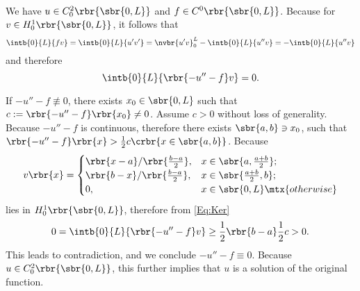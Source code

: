 \documentclass[english, nochinese]{pkupaper}
\title{\titlemark}
\author{\authoring}
\begin{document}
\maketitle

\begin{thmquestion}
\ 
\begin{thmproof}
We have $ u \in C_0^2 \rbr{\sbr{ 0, L }} $ and $ f \in C^0 \rbr{\sbr{ 0, L }} $. Because for $ v \in H_0^1 \rbr{\sbr{ 0, L }} $, it follows that
\begin{equation}
\intb{0}{L}{ f v } = \intb{0}{L}{ u' v' } = \nvbr{ u' v }_0^L - \intb{0}{L}{ u'' v } = -\intb{0}{L}{ u'' v }
\end{equation}
and therefore
\begin{equation} \label{Eq:Ker}
\intb{0}{L}{ \rbr{ -u'' - f } v } = 0.
\end{equation}

If $ -u'' - f \nequiv 0 $, there exists $ x_0 \in \sbr{ 0, L } $ such that $ c := \rbr{ -u'' - f } \rbr{x_0} \neq 0 $. Assume $ c > 0 $ without loss of generality. Because $ -u'' - f $ is continuous, therefore there exists $ \sbr{ a, b } \ni x_0 $, such that $ \rbr{ -u'' - f } \rbr{x} > \frac{1}{2} c \crbr{ x \in \sbr{ a, b } } $. Because
\begin{equation}
v \rbr{x} =
\begin{cases}
\rbr{ x - a } / \rbr{ \frac{ b - a }{2} }, & x \in \sbr{ a, \frac{ a + b }{2} }; \\
\rbr{ b - x } / \rbr{ \frac{ b - a }{2} }, & x \in \sbr{ \frac{ a + b }{2}, b }; \\
0, & x \in \sbr{ 0, L } \mtx{otherwise}
\end{cases}
\end{equation}
lies in $ H_0^1 \rbr{\sbr{ 0, L }} $, therefore from \eqref{Eq:Ker}
\begin{equation}
0 = \intb{0}{L}{ \rbr{ -u'' - f } v } \ge \frac{1}{2} \rbr{ b - a } \frac{1}{2} c > 0.
\end{equation}
This leads to contradiction, and we conclude $ -u'' - f \equiv 0 $. Because $ u \in C_0^2 \rbr{\sbr{ 0, L }} $, this further implies that $u$ is a solution of the original function.

\sqed
\end{thmproof}
\end{thmquestion}
\end{document}
